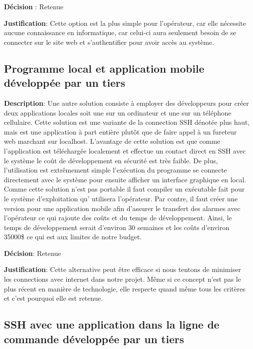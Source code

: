 \textbf{Décision} : Retenue

\textbf{Justification}: Cette option est la plus simple pour l’opérateur, car elle nécessite aucune connaissance en informatique, car celui-ci aura seulement besoin de se connecter sur le site web et s’authentifier pour avoir accès au système.

\subsection {Programme local et application mobile développée par un tiers}

\textbf{Description}:
Une autre solution consiste à employer des développeurs pour créer deux applications locales soit une sur un ordinateur et une sur un téléphone cellulaire. Cette solution est une variante de la connection SSH dénotée plus haut, mais est une application à part entière plutôt que de faire appel à un fureteur web marchant sur localhost. L’avantage de cette solution est que comme l’application est téléchargée localement et effectue un contact direct en SSH avec le système le coût de développement en sécurité est très faible. De plus, l’utilisation est extrêmement simple l'exécution du programme se connecte directement avec le système pour ensuite afficher un interface graphique en local. Comme cette solution n’est pas portable il faut compiler un exécutable fait pour le système d’exploitation qu’ utilisera l’opérateur. Par contre, il faut créer une version pour une application mobile afin d’assurer le transfert des alarmes avec l’opérateur ce qui rajoute des coûts et du temps de développement. Ainsi, le temps de développement serait d'environ 30 semaines et les coûts d’environ 35000\$ ce qui est aux limites de notre budget.

\textbf{Décision}: Retenue

\textbf{Justification}: Cette alternative peut être efficace si nous tentons de minimiser les connections avec internet dans notre projet. Même si ce concept n’est pas le plus récent en manière de technologie, elle respecte quand même tous les critères et c’est pourquoi elle est retenue.

\subsection {SSH avec une application dans la ligne de commande développée par un tiers}

